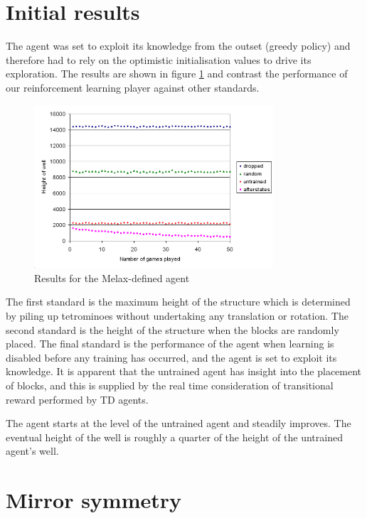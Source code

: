 \documentclass{rucsthesis}
\begin{document}
\section{Initial results}

The agent was set to exploit its knowledge from the outset (greedy policy) and therefore had to rely on the optimistic initialisation values to drive its exploration. The results are shown in figure \ref{fig:mymelaxresults} and contrast the performance of our reinforcement learning player against other standards. 

\begin{figure}[h]
\centering
\includegraphics[width=3.5in]{mymelaxresults.png}
\caption{Results for the Melax-defined agent}
\label{fig:mymelaxresults}
\end{figure}

The first standard is the maximum height of the structure which is determined by piling up tetrominoes without undertaking any translation or rotation. The second standard is the height of the structure when the blocks are randomly placed. The final standard is the performance of the agent when learning is disabled before any training has occurred, and the agent is set to exploit its knowledge. It is apparent that the untrained agent has insight into the placement of blocks, and this is supplied by the real time consideration of transitional reward performed by TD agents.

The agent starts at the level of the untrained agent and steadily improves. The eventual height of the well is roughly a quarter of the height of the untrained agent's well.

\section{Mirror symmetry}
\end{document}
